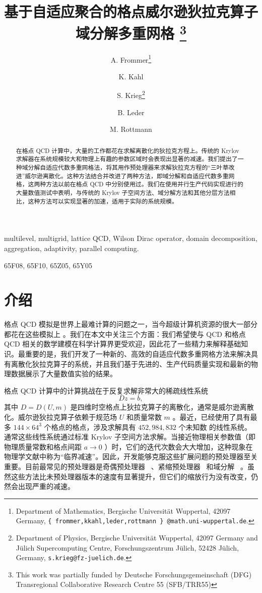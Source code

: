 \documentclass{siamltex}
\title{基于自适应聚合的格点威尔逊狄拉克算子域分解多重网格  \thanks{This work was partially funded by Deutsche Forschungsgemeinschaft (DFG) Transregional Collaborative Research Centre 55 (SFB/TRR55)}   }
\author{A. Frommer\thanks{Department of Mathematics, Bergische Universit\"{a}t Wuppertal, 42097 Germany, {\tt  \{ frommer,kkahl,leder,rottmann \} @math.uni-wuppertal.de}.}
\and K. Kahl\footnotemark[2]
\and S. Krieg\thanks{Department of Physics, Bergische Universit\"{a}t Wuppertal, 42097 Germany and J\"{u}lich Supercomputing Centre, Forschungszentrum J\"{u}lich, 52428 J\"{u}lich, Germany, {\tt s.krieg@fz-juelich.de}.}
\and B. Leder\footnotemark[2]
\and M. Rottmann\footnotemark[2]
}
\begin{document}
\maketitle
\begin{abstract}在格点 QCD 计算中，大量的工作都花在求解离散化的狄拉克方程上。传统的 Krylov 求解器在系统规模较大和物理上有趣的参数区域时会表现出显著的减速。我们提出了一种域分解自适应代数多重网格法，将其用作预处理器来求解狄拉克方程的“三叶草改进”威尔逊离散化。这种方法结合并改进了两种方法，即域分解和自适应代数多重网格，这两种方法以前在格点 QCD 中分别使用过。我们在使用并行生产代码实现进行的大量数值测试中表明，与传统的 Krylov 子空间方法、域分解方法和其他分层方法相比，这种方法可以实现显著的加速，适用于实际的系统规模。  \end{abstract}

\begin{keywords}
  multilevel, multigrid, lattice QCD, Wilson Dirac operator, domain decomposition, aggregation, adaptivity, parallel computing.
\end{keywords}

\begin{AMS}
  65F08,
  65F10,
  65Z05,
  65Y05
\end{AMS}
\section{介绍  }    格点 QCD 模拟是世界上最难计算的问题之一，当今超级计算机资源的很大一部分都花在这些模拟上    \cite{PRACE:ScAnnRep12,PRACE:ScC12}    。我们在本文中关注三个方面：我们希望使与 QCD 和格点 QCD 相关的数学建模在科学计算界更受欢迎，因此花了一些精力来解释基础知识。最重要的是，我们开发了一种新的、高效的自适应代数多重网格方法来解决具有离散化狄拉克算子的系统，并且我们基于先进的、生产代码质量实现和最新的物理数据展示了大量数值实验的结果。

格点 QCD 计算中的计算挑战在于反复求解非常大的稀疏线性系统
\begin{equation}\label{eq:discreteDirac}
  Dz = b,
\end{equation}    其中    $D = D(U,m)$    是四维时空格点上狄拉克算子的离散化，通常是威尔逊离散化。威尔逊狄拉克算子依赖于规范场    $U$    和质量常数    $m$    。最近，已经使用了具有最多    $144\times64^3$    个格点的格点，涉及求解具有    $452,\!984,\!832$    个未知数    \cite{Alexandrou:2011db,Bae:2011ff,Bali:2012qs,Durr:2010aw,Fritzsch:2012wq}    的线性系统。通常这些线性系统通过标准 Krylov 子空间方法求解。当接近物理相关参数值（即物理质量常数和格点间距    $a\rightarrow 0$    ）时，它们的迭代次数会大大增加，这种现象在物理学文献中称为“临界减速”。因此，开发能够克服这些扩展问题的预处理器至关重要。目前最常见的预处理器是奇偶预处理器~    \cite{Degrand1990211,Lippert19991357}    、紧缩预处理器~    \cite{Luescher2007}    和域分解~    \cite{Nobile2012,Luescher2003}    。虽然这些方法比未预处理器版本的速度有显著提升，但它们的缩放行为没有改变，仍然会出现严重的减速。
\end{document}
